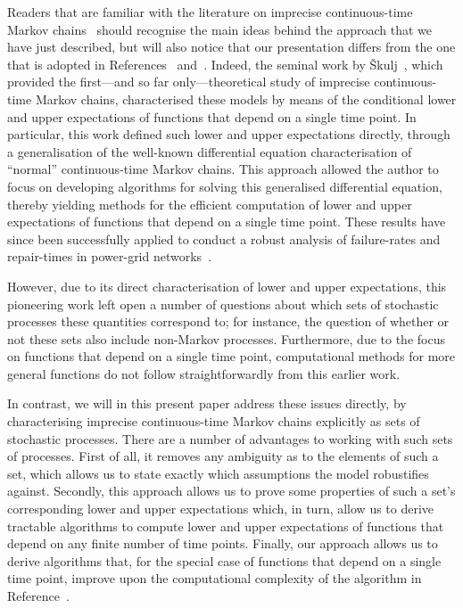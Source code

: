 \documentclass[10pt,a4paper]{paper}
\theoremstyle{definition}
\begin{document}
Readers that are familiar with the literature on imprecise continuous-time Markov chains~\cite{Skulj:2015cq,troffaes2015using} should recognise the main ideas behind the approach that we have just described, but will also notice that our presentation differs from the one that is adopted in References~\cite{Skulj:2015cq} and~\cite{troffaes2015using}. Indeed, the seminal work by {\v{S}}kulj~\cite{Skulj:2015cq}, which provided the first---and so far only---theoretical study of imprecise continuous-time Markov chains, characterised these models by means of the conditional lower and upper expectations of functions that depend on a single time point. In particular, this work defined such lower and upper expectations directly, through a generalisation of the well-known differential equation characterisation of ``normal'' continuous-time Markov chains. This approach allowed the author to focus on developing algorithms for solving this generalised differential equation, thereby yielding methods for the efficient computation of lower and upper expectations of functions that depend on a single time point. These results have since been successfully applied to conduct a robust analysis of failure-rates and repair-times in power-grid networks~\cite{troffaes2015using}.

However, due to its direct characterisation of lower and upper expectations, this pioneering work left open a number of questions about which sets of stochastic processes these quantities correspond to; for instance, the question of whether or not these sets also include non-Markov processes. Furthermore, due to the focus on functions that depend on a single time point, computational methods for more general functions do not follow straightforwardly from this earlier work.

In contrast, we will in this present paper address these issues directly, by characterising imprecise continuous-time Markov chains explicitly as sets of stochastic processes. There are a number of advantages to working with such sets of processes. First of all, it removes any ambiguity as to the elements of such a set, which allows us to state exactly which assumptions the model robustifies against. Secondly, this approach allows us to prove some properties of such a set's corresponding lower and upper expectations which, in turn, allow us to derive tractable algorithms to compute lower and upper expectations of functions that depend on any finite number of time points. Finally, our approach allows us to derive algorithms that, for the special case of functions that depend on a single time point, improve upon the computational complexity of the algorithm in Reference~\cite{Skulj:2015cq}.
\end{document}
